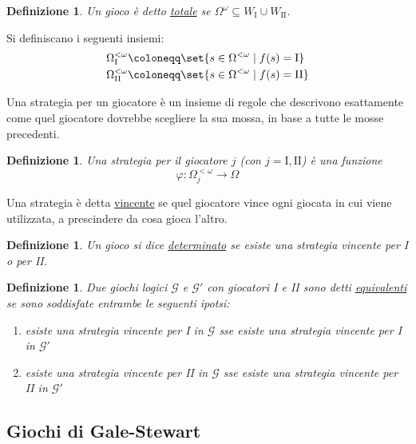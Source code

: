 \documentclass[titlepage]{article}
\newcommand{\1}{\mathds{1}}
\theoremstyle{definition}%
\theoremstyle{plain}
\newtheorem{defn}[thm]{Definizione}
\theoremstyle{remark}
\begin{document}
\begin{defn}
Un gioco è detto \uline{totale} se \(\Omega^{\omega} \subseteq W_{\text{I}}\cup W_{\text{II}}\).
\end{defn}

Si definiscano i seguenti insiemi:
\begin{align*}
\Omega^{<\omega}_{\text{I}} &\coloneqq \set{s \in \Omega^{<\omega}\mid f(s) = \text{I}}\\
\Omega^{<\omega}_{\text{II}} &\coloneqq \set{s \in \Omega^{<\omega}\mid f(s) = \text{II}}
\end{align*}

Una strategia per un giocatore è un insieme di regole che descrivono esattamente come quel giocatore dovrebbe scegliere la sua mossa, in base a tutte le mosse precedenti.

\begin{defn}
Una strategia per il giocatore \(j\) (con \(j=\text{I},\text{II}\)) è una funzione
\begin{equation*}
\varphi: \Omega_{j}^{<\omega} \to \Omega
\end{equation*}
\end{defn}

Una strategia è detta \uline{vincente} se quel giocatore vince ogni giocata in cui viene utilizzata, a prescindere da cosa gioca l'altro.

\begin{defn}
Un gioco si dice \uline{determinato} se esiste una strategia vincente per I o per II.
\end{defn}

\begin{defn}
Due {giochi logici} \(\mathcal{G}\) e \(\mathcal{G'}\) con giocatori I e II sono detti \uline{equivalenti} se sono soddisfate entrambe le seguenti ipotsi:
\begin{enumerate}
\item esiste una strategia vincente per I in \(\mathcal{G}\) sse esiste una strategia vincente per I in \(\mathcal{G}'\)
\item esiste una strategia vincente per II in \(\mathcal{G}\) sse esiste una strategia vincente per II in \(\mathcal{G}'\)
\end{enumerate}
\end{defn}

\subsection{Giochi di Gale-Stewart}
\label{sec:org382d9d1}
\end{document}
